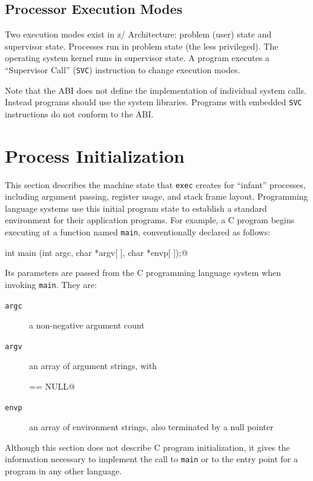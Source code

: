\documentclass[USenglish,fontsize=11pt,twoside,%
  toc=bib,toc=idx,toc=graduated,numbers=noendperiod,
  bookmarks=true,
  bookmarksnumbered=true,
  bookmarksopen=true,
  bookmarksopenlevel=1,
  breaklinks=true,
  colorlinks=true,
  linkcolor=black,
  pdfpagelayout={TwoPageRight},
  pdfusetitle=true
]{scrreprt}
\newcommand{\ARCH}{z/\kern-1pt Ar\-chi\-tec\-ture}
\newcommand{\ARCHarch}{\ARCH}
\newcommand{\ARCH}{ESA/390}
\newcommand{\ARCHarch}{the \ARCH{} ar\-chi\-tec\-ture}
\begin{document}
\subsection{Processor Execution Modes}
Two execution modes exist in \ARCHarch{}: problem (user) state and
supervisor state.  Processes run in problem state (the less privileged).
The operating system kernel runs in supervisor state.  A program executes
a ``Supervisor Call'' (\texttt{SVC}) instruction to change execution
modes.

Note that the ABI does not define the implementation of individual
system calls.  Instead programs should use the system libraries.
Programs with embedded \texttt{SVC} instructions do not conform
to the ABI.

\section{Process Initialization}
\label{procinit}
This section describes the machine state that \texttt{exec} creates
for ``infant'' processes, including argument passing, register usage,
and stack frame layout.  Programming language systems use this initial
program state to establish a standard environment for their
application programs.  For example, a C program begins executing at a
function named \texttt{main}, conventionally declared as follows:
\begin{center}
  \lstinline@extern int main (int argc, char *argv[ ], char *envp[ ]);@
\end{center}

Its parameters are passed from the C programming language system when
invoking \texttt{main}.  They are:
\begin{description}
\item[\texttt{argc}] a non-negative argument count
\item[\texttt{argv}] an array of argument strings, with
  \begin{center}
    \lstinline@argv[argc] == NULL@
  \end{center}
\item[\texttt{envp}] an array of environment strings, also terminated by a
  null pointer
\end{description}

Although this section does not describe C program initialization, it
gives the information necessary to implement the call to \texttt{main}
or to the entry point for a program in any other language.
\end{document}
